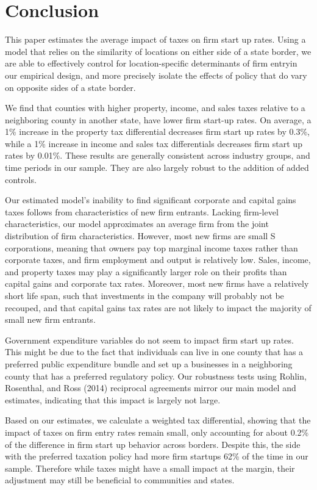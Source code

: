 \section{Conclusion}

This paper estimates the average impact of taxes on firm start up rates. Using a model that relies on the similarity of locations on either side of a state border, we are able to effectively control for location-specific determinants of firm entryin our empirical design, and more precisely isolate the effects of policy  that do vary on opposite sides of a state border. 

We find that counties with higher property, income, and sales taxes relative to a neighboring county in another state, have lower firm start-up rates. On average, a 1\% increase in the property tax differential decreases firm start up rates by 0.3\%, while a 1\% increase in income and sales tax differentials decreases firm start up rates by 0.01\%.   These results are generally consistent across industry groups, and time periods in our sample.  They are also largely robust to the addition of added controls.

Our estimated model's inability to find significant corporate and capital gains taxes follows from characteristics of new firm entrants. Lacking firm-level characteristics, our model approximates an average firm from the joint distribution of firm characteristics. However, most new firms are small S corporations, meaning that owners pay top marginal income taxes rather than corporate taxes, and firm employment and output is relatively low. Sales, income, and property taxes may play a significantly larger role on their profits than capital gains and corporate tax rates. Moreover, most new firms have a relatively short life span, such that investments in the company will probably not be recouped, and that capital gains tax rates are not likely to impact the majority of small new firm entrants.

Government expenditure variables do not seem to impact firm start up rates. This might be due to the fact that individuals can live in one county that has a preferred public expenditure bundle and set up a businesses in a neighboring county that has a preferred regulatory policy. Our robustness tests using Rohlin, Rosenthal, and Ross (2014) reciprocal agreements mirror our main model and estimates, indicating that this impact is largely not large.

Based on our estimates, we calculate a weighted tax differential, showing that the impact of taxes on firm entry rates remain small, only accounting for about 0.2\% of the difference in firm start up behavior across borders. Despite this, the side with the preferred taxation policy had more firm startups 62\% of the time in our sample. Therefore while taxes might have a small impact at the margin, their adjustment may still be beneficial to communities and states. 


